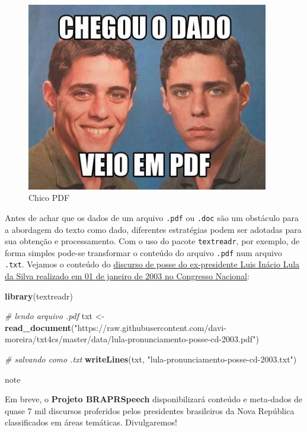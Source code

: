 \documentclass[]{book}
\newenvironment{Shaded}{\begin{snugshade}}{\end{snugshade}}
\newcommand{\CommentTok}[1]{\textcolor[rgb]{0.56,0.35,0.01}{\textit{#1}}}
\newcommand{\KeywordTok}[1]{\textcolor[rgb]{0.13,0.29,0.53}{\textbf{#1}}}
\newcommand{\NormalTok}[1]{#1}
\newcommand{\StringTok}[1]{\textcolor[rgb]{0.31,0.60,0.02}{#1}}
\begin{document}
\begin{figure}
\centering
\includegraphics[width=4.16667in,height=\textheight]{images/chico_pdf.jpg}
\caption{Chico PDF}
\end{figure}

Antes de achar que os dados de um arquivo \texttt{.pdf} ou \texttt{.doc} são um obstáculo para
a abordagem do texto como dado, diferentes estratégias podem ser adotadas para sua
obtenção e processamento. Com o uso do pacote \texttt{textreadr}, por exemplo, de forma
simples pode-se transformar o conteúdo do arquivo \texttt{.pdf} num arquivo \texttt{.txt}. Vejamos o
conteúdo do \href{http://www.biblioteca.presidencia.gov.br/presidencia/ex-presidentes/luiz-inacio-lula-da-silva/discursos/1o-mandato/2003/01-01-pronunciamento-a-nacao-do-presidente-da-republica-luiz-inacio-lula-da-silva-apos-a-cerimonia-de-posse.pdf/view}{discurso de posse do ex-presidente Luis Inácio Lula da Silva realizado em
01 de janeiro de 2003 no Congresso Nacional}:

\begin{Shaded}
\begin{Highlighting}[]
\KeywordTok{library}\NormalTok{(textreadr)}

\CommentTok{# lendo arquivo .pdf}
\NormalTok{txt <-}\StringTok{ }\KeywordTok{read_document}\NormalTok{(}\StringTok{"https://raw.githubusercontent.com/davi-moreira/txt4cs/master/data/lula-pronunciamento-posse-cd-2003.pdf"}\NormalTok{)}

\CommentTok{# salvando como .txt}
\KeywordTok{writeLines}\NormalTok{(txt, }\StringTok{"lula-pronunciamento-posse-cd-2003.txt"}\NormalTok{)}
\end{Highlighting}
\end{Shaded}

\begin{infobox}note

Em breve, o \textbf{Projeto BRAPRSpeech} disponibilizará conteúdo e meta-dados de quase 7 mil
discursos proferidos pelos presidentes brasileiros da Nova República classificados em áreas temáticas. Divulgaremos!

\end{infobox}
\end{document}
